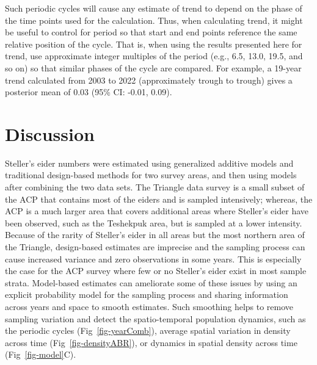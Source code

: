 \documentclass[
  10pt,
  letterpaper,
]{article}
\begin{document}
Such periodic cycles will cause any estimate of trend to depend on the
phase of the time points used for the calculation. Thus, when
calculating trend, it might be useful to control for period so that
start and end points reference the same relative position of the cycle.
That is, when using the results presented here for trend, use
approximate integer multiples of the period (e.g., 6.5, 13.0, 19.5, and
so on) so that similar phases of the cycle are compared. For example, a
19-year trend calculated from 2003 to 2022 (approximately trough to trough) gives a posterior mean of 0.03 (95\% CI: -0.01, 0.09).

\section{Discussion}\label{discussion}

Steller's eider numbers were estimated using generalized additive models
and traditional design-based methods for two survey areas, and then
using models after combining the two data sets. The Triangle data survey
is a small subset of the ACP that contains most of the eiders and is
sampled intensively; whereas, the ACP is a much larger area that covers
additional areas where Steller's eider have been observed, such as the
Teshekpuk area, but is sampled at a lower intensity. Because of the
rarity of Steller's eider in all areas but the most northern area of the
Triangle, design-based estimates are imprecise and the sampling process
can cause increased variance and zero observations in some years. This
is especially the case for the ACP survey where few or no Steller's
eider exist in most sample strata. Model-based estimates can ameliorate
some of these issues by using an explicit probability model for the
sampling process and sharing information across years and space to
smooth estimates. Such smoothing helps to remove sampling variation and
detect the spatio-temporal population dynamics, such as the periodic
cycles (Fig~\ref{fig-yearComb}), average spatial variation in density
across time (Fig~\ref{fig-densityABR}), or dynamics in spatial density
across time (Fig~\ref{fig-model}C).
\end{document}

